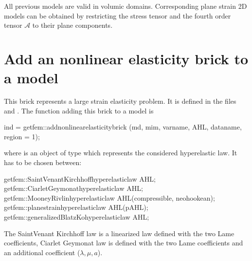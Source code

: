 \documentclass[a4paper,11pt,english]{sphinxmanual}
\begin{document}
\subsubsection{}
\label{\detokenize{userdoc/model_nonlinear_elasticity:plane-strain-hyper-elasticity}}
All previous models are valid in volumic domains. Corresponding plane strain 2D models can be obtained by restricting the stress tensor and the fourth order tensor \(\mathcal{A}\) to their plane components.


\section{Add an nonlinear elasticity brick to a model}
\label{\detokenize{userdoc/model_nonlinear_elasticity:add-an-nonlinear-elasticity-brick-to-a-model}}
This brick represents a large strain elasticity problem. It is defined in the files  and . The function adding this brick to a model is

\begin{sphinxVerbatim}[commandchars=\\\{\}]
ind = getfem::add\PYGZus{}nonlinear\PYGZus{}elasticity\PYGZus{}brick
  (md, mim, varname, AHL, dataname, region = \PYGZhy{}1);
\end{sphinxVerbatim}

where  is an object of type  which represents the considered hyperelastic law. It has to be chosen between:

\begin{sphinxVerbatim}[commandchars=\\\{\}]
getfem::SaintVenant\PYGZus{}Kirchhoff\PYGZus{}hyperelastic\PYGZus{}law AHL;
getfem::Ciarlet\PYGZus{}Geymonat\PYGZus{}hyperelastic\PYGZus{}law AHL;
getfem::Mooney\PYGZus{}Rivlin\PYGZus{}hyperelastic\PYGZus{}law AHL(compressible, neohookean);
getfem::plane\PYGZus{}strain\PYGZus{}hyperelastic\PYGZus{}law AHL(pAHL);
getfem::generalized\PYGZus{}Blatz\PYGZus{}Ko\PYGZus{}hyperelastic\PYGZus{}law AHL;
\end{sphinxVerbatim}

The Saint\sphinxhyphen{}Venant Kirchhoff law is a linearized law defined with the two Lame coefficients, Ciarlet Geymonat law is defined with the two Lame coefficients and an additional coefficient (\(\lambda, \mu, a\)).
\end{document}
